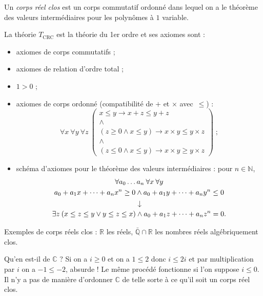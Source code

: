 \documentclass[./main]{subfiles}
\begin{document}
  \begin{defn}
    Un \textit{corps réel clos} est un corps commutatif ordonné dans lequel on a le théorème des valeurs intermédiaires pour les polynômes à $1$ variable.

    La théorie $T_\mathrm{CRC}$ est la théorie du 1er ordre et ses axiomes sont :
    \begin{itemize}
      \item axiomes de corps commutatifs ;
      \item axiomes de relation d'ordre total ;
      \item $1 > 0$ ;
      \item axiomes de corps ordonné (compatibilité de $+$ et $\times$ avec~$\le$) :
        \[
        \forall x \: \forall y \: \forall z \: 
        \begin{pmatrix}
          x \le  y \to  x + z \le  y + z\\
          \land\\
          (z \ge 0 \land x \le y) \to x \times y \le  y \times z\\
          \land \\
          (z \le 0 \land x \le y) \to x \times y \ge y \times z
        \end{pmatrix}  \;
        ;\]
      \item schéma d'axiomes pour le théorème des valeurs intermédiaires : pour $n \in \mathds{N}$, 
        \begin{gather*}
        \forall a_0 \ldots a_n \: \forall x \: \forall y\\
        a_0 + a_1 x + \cdots + a_n x^n \ge 0 \land a_0 + a_1 y + \cdots + a_n y^n \le 0\\
        \vertical\to\\
        \exists z \: (x \le z \le y \lor y \le z \le x) \land a_0 + a_1 z + \cdots + a_n z^n = 0
        .\end{gather*}
    \end{itemize}
  \end{defn}

  \begin{exm}
    Exemples de corps réels clos : $\mathds{R}$ les réels, $\bar{\mathds{Q}} \cap \mathds{R}$ les nombres réels algébriquement clos.

    Qu'en est-il de $\mathds{C}$ ?
    Si on a $i \ge 0$ et on a $1 \le 2$ donc $i \le 2 i$ et par multiplication par $i$ on a $-1 \le -2$, absurde !
    Le même procédé fonctionne si l'on suppose $i\le 0$.
    Il n'y a pas de manière d'ordonner $\mathds{C}$ de telle sorte à ce qu'il soit un corps réel clos.
  \end{exm}
\end{document}
